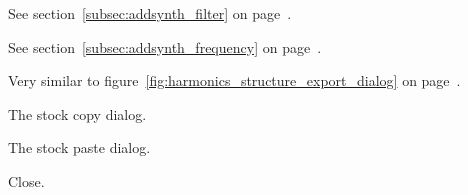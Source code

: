    See section~\ref{subsec:addsynth_filter}
   on page~\pageref{subsec:addsynth_filter}.

   See section~\ref{subsec:addsynth_frequency}
   on page~\pageref{subsec:addsynth_frequency}.

   Very similar to 
   figure~\ref{fig:harmonics_structure_export_dialog}
   on page~\pageref{fig:harmonics_structure_export_dialog}.

   The stock copy dialog.

   The stock paste dialog.

   Close.



